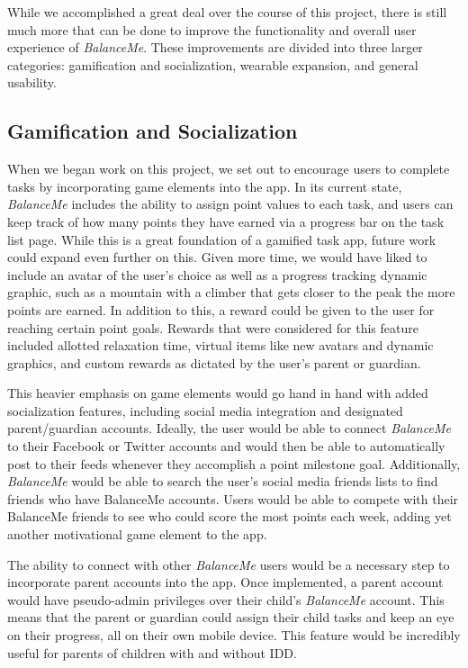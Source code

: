 \documentclass{sigchi}
\begin{document}

While we accomplished a great deal over the course of this project, there is
still much more that can be done to improve the functionality and overall user
experience of \textit{BalanceMe}. These improvements are divided into three
larger categories: gamification and socialization, wearable expansion, and
general usability.

\subsection{Gamification and Socialization}

When we began work on this project, we set out to encourage users to complete
tasks by incorporating game elements into the app. In its current state,
\textit{BalanceMe} includes the ability to assign point values to each task,
and users can keep track of how many points they have earned via a progress bar
on the task list page. While this is a great foundation of a gamified task app,
future work could expand even further on this. Given more time, we would have
liked to include an avatar of the user’s choice as well as a progress tracking
dynamic graphic, such as a mountain with a climber that gets closer to the peak
the more points are earned. In addition to this, a reward could be given to the
user for reaching certain point goals. Rewards that were considered for this
feature included allotted relaxation time, virtual items like new avatars and
dynamic graphics, and custom rewards as dictated by the user’s parent or
guardian.

This heavier emphasis on game elements would go hand in hand with added
socialization features, including social media integration and designated
parent/guardian accounts. Ideally, the user would be able to connect
\textit{BalanceMe} to their Facebook or Twitter accounts and would then be able
to automatically post to their feeds whenever they accomplish a point milestone
goal. Additionally, \textit{BalanceMe} would be able to search the user’s
social media friends lists to find friends who have BalanceMe accounts. Users
would be able to compete with their BalanceMe friends to see who could score
the most points each week, adding yet another motivational game element to the
app.

The ability to connect with other \textit{BalanceMe} users would be a necessary
step to incorporate parent accounts into the app. Once implemented, a parent
account would have pseudo-admin privileges over their child’s \textit{BalanceMe}
account. This means that the parent or guardian could assign their child tasks
and keep an eye on their progress, all on their own mobile device. This feature
would be incredibly useful for parents of children with and without IDD.
\end{document}
